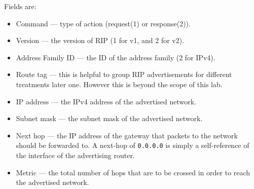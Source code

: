 \documentclass[pdftex,12pt,a4paper]{article}
\begin{document}
        Fields are:
        \begin{itemize}
            \item Command --- type of action (request(1) or response(2)).
            \item Version --- the version of RIP (1 for v1, and 2 for v2).
            \item Address Family ID --- the ID of the address family (2 for
                IPv4).
            \item Route tag --- this is helpful to group RIP advertisements for
                different treatments later one. However this is beyond the
                scope of this lab.
            \item IP address --- the IPv4 address of the advertised network.
            \item Subnet mask --- the subnet mask of the advertised network.
            \item Next hop --- the IP address of the gateway that packets
                to the network should be forwarded to. A next-hop of
                \texttt{0.0.0.0} is simply a self-reference of the interface of
                the advertising router.
            \item Metric --- the total number of hops that are to be crossed in
                order to reach the advertised network.
        \end{itemize}
\end{document}
